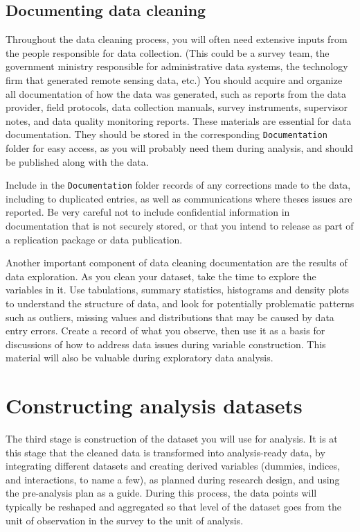 \subsection{Documenting data cleaning}
Throughout the data cleaning process,
you will often need extensive inputs from the people responsible for data collection.
(This could be a survey team, the government ministry responsible for administrative data systems,
the technology firm that generated remote sensing data, etc.)
You should acquire and organize all documentation of how the data was generated, such as
reports from the data provider, field protocols, data collection manuals, survey instruments,
supervisor notes, and data quality monitoring reports.
These materials are essential for data documentation.
They should be stored in the corresponding \texttt{Documentation} folder for easy access,
as you will probably need them during analysis,
and should be published along with the data.

Include in the \texttt{Documentation} folder records of any
corrections made to the data, including to duplicated entries,
as well as communications where theses issues are reported.
Be very careful not to include confidential information in documentation that is not securely stored,
or that you intend to release as part of a replication package or data publication.

Another important component of data cleaning documentation are the results of data exploration.
As you clean your dataset, take the time to explore the variables in it.
Use tabulations, summary statistics, histograms and density plots to understand the structure of data,
and look for potentially problematic patterns such as outliers,
missing values and distributions that may be caused by data entry errors.
Create a record of what you observe,
then use it as a basis for discussions of how to address data issues during variable construction.
This material will also be valuable during exploratory data analysis.

\section{Constructing analysis datasets}

The third stage is construction of the dataset you will use for analysis.
It is at this stage that the cleaned data is transformed into analysis-ready data, 
by integrating different datasets and creating derived variables 
(dummies, indices, and interactions, to name a few),
as planned during research design,
and using the pre-analysis plan as a guide.
During this process, the data points will typically be reshaped and aggregated
so that level of the dataset goes from the unit of observation in the survey 
to the unit of analysis.


